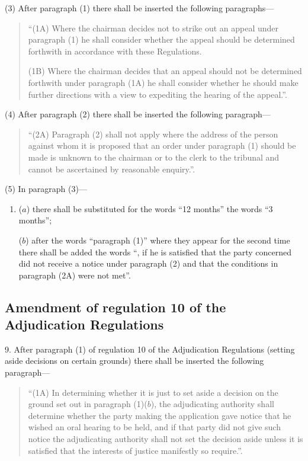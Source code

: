 \documentclass[a4paper]{article}
\begin{document}
(3) After paragraph (1) there shall be inserted the following paragraphs—
\begin{quotation}
“(1A) Where the chairman decides not to strike out an appeal under paragraph (1) he shall consider whether the appeal should be determined forthwith in accordance with these Regulations.

(1B) Where the chairman decides that an appeal should not be determined forthwith under paragraph (1A) he shall consider whether he should make further directions with a view to expediting the hearing of the appeal.”.
\end{quotation}

(4) After paragraph (2) there shall be inserted the following paragraph—
\begin{quotation}
“(2A) Paragraph (2) shall not apply where the address of the person against whom it is proposed that an order under paragraph (1) should be made is unknown to the chairman or to the clerk to the tribunal and cannot be ascertained by reasonable enquiry.”.
\end{quotation}

(5) In paragraph (3)—
\begin{enumerate}\item[]
($a$) there shall be substituted for the words “12 months” the words “3 months”;

($b$) after the words “paragraph (1)” where they appear for the second time there shall be added the words “, if he is satisfied that the party concerned did not receive a notice under paragraph (2) and that the conditions in paragraph (2A) were not met”.
\end{enumerate}

\subsection[9. Amendment of regulation 10 of the Adjudication Regulations]{Amendment of regulation 10 of the Adjudication Regulations}

9.  After paragraph (1) of regulation 10 of the Adjudication Regulations (setting aside decisions on certain grounds) there shall be inserted the following paragraph—
\begin{quotation}
“(1A) In determining whether it is just to set aside a decision on the ground set out in paragraph (1)($b$), the adjudicating authority shall determine whether the party making the application gave notice that he wished an oral hearing to be held, and if that party did not give such notice the adjudicating authority shall not set the decision aside unless it is satisfied that the interests of justice manifestly so require.”.
\end{quotation}
\end{document}
